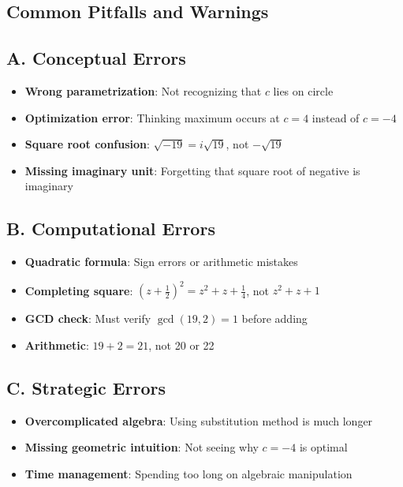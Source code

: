\documentclass[11pt]{article}
\begin{document}
\begin{pitfallbox}
\section*{Common Pitfalls and Warnings}

\subsection*{A. Conceptual Errors}
\begin{itemize}[leftmargin=*]
    \item \textbf{Wrong parametrization}: Not recognizing that $c$ lies on circle
    \item \textbf{Optimization error}: Thinking maximum occurs at $c = 4$ instead of $c = -4$
    \item \textbf{Square root confusion}: $\sqrt{-19} = i\sqrt{19}$, not $-\sqrt{19}$
    \item \textbf{Missing imaginary unit}: Forgetting that square root of negative is imaginary
\end{itemize}

\subsection*{B. Computational Errors}
\begin{itemize}[leftmargin=*]
    \item \textbf{Quadratic formula}: Sign errors or arithmetic mistakes
    \item \textbf{Completing square}: $(z + \frac{1}{2})^2 = z^2 + z + \frac{1}{4}$, not $z^2 + z + 1$
    \item \textbf{GCD check}: Must verify $\gcd(19, 2) = 1$ before adding
    \item \textbf{Arithmetic}: $19 + 2 = 21$, not 20 or 22
\end{itemize}

\subsection*{C. Strategic Errors}
\begin{itemize}[leftmargin=*]
    \item \textbf{Overcomplicated algebra}: Using substitution method is much longer
    \item \textbf{Missing geometric intuition}: Not seeing why $c = -4$ is optimal
    \item \textbf{Time management}: Spending too long on algebraic manipulation
\end{itemize}


\end{pitfallbox}
\end{document}
